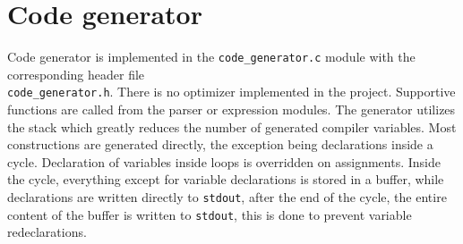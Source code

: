 \section{Code generator}
\label{Code generator}

Code generator is implemented in the \verb|code_generator.c| module with the corresponding header file \\ \verb|code_generator.h|.
There is no optimizer implemented in the project. Supportive functions are called from the parser or expression modules. The generator utilizes the stack which greatly reduces the number of generated compiler variables. Most constructions are generated directly, the exception being declarations inside a cycle. Declaration of variables inside loops is overridden on assignments. Inside the cycle, everything except for variable declarations is stored in a buffer, while declarations are written directly to \texttt{stdout}, after the end of the cycle, the entire content of the buffer is written to \texttt{stdout}, this is done to prevent variable redeclarations.